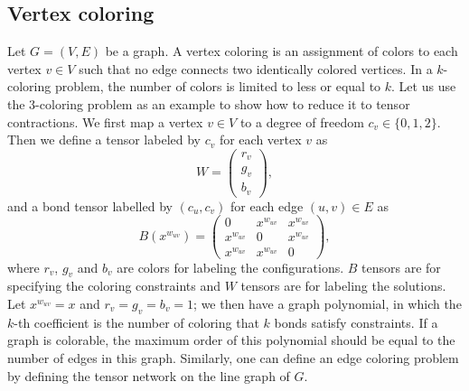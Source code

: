 \documentclass[onefignum, onetabnum]{siamart190516}
\newcommand{\<}{\langle}
\renewcommand{\>}{\rangle}
\newcounter{example}
\begin{document}
\subsection{Vertex coloring}
Let $G=(V,E)$ be a graph. A vertex coloring is an assignment of colors to each vertex $v\in V$ such that no edge connects two identically colored vertices. 
In a $k$-coloring problem, the number of colors is limited to less or equal to $k$.
Let us use the 3-coloring problem as an example to show how to reduce it to tensor contractions.
We first map a vertex $v \in V$ to a degree of freedom $c_v\in\{0,1,2\}$.
Then we define a tensor labeled by $c_v$ for each vertex $v$ as
\begin{equation}
    W = \left(\begin{matrix}
        r_v\\
        g_v\\
        b_v
    \end{matrix}\right),
\end{equation}
and a bond tensor labelled by $(c_u, c_v) $ for each edge $(u, v) \in E$ as
\begin{equation}
    B(x^{w_{uv}}) = \left(\begin{matrix}
        0 & x^{w_{uv}} & x^{w_{uv}}\\
        x^{w_{uv}} & 0 & x^{w_{uv}}\\
        x^{w_{uv}} & x^{w_{uv}} & 0
    \end{matrix}\right),
\end{equation}
where $r_v$, $g_v$ and $b_v$ are colors for labeling the configurations. $B$ tensors are for specifying the coloring constraints and $W$ tensors are for labeling the solutions.
Let $x^{w_{uv}} = x$ and $r_v = g_v = b_v = 1$; we then have a graph polynomial,
in which the $k$-th coefficient is the number of coloring that $k$ bonds satisfy constraints.
If a graph is colorable, the maximum order of this polynomial should be equal to the number of edges in this graph.
Similarly, one can define an edge coloring problem by defining the tensor network on the line graph of $G$.
\end{document}
